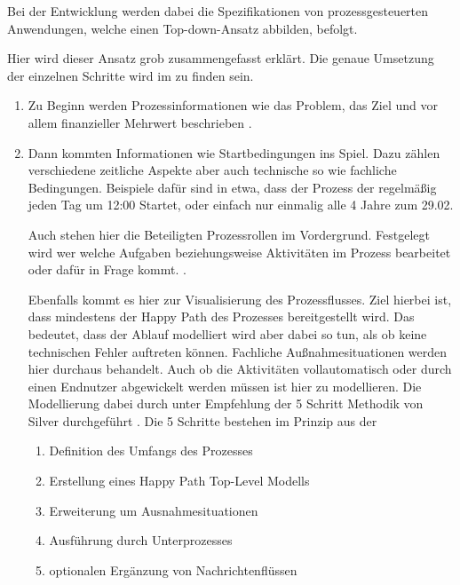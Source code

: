 \label{par:spezifikation_von_prozessgesteuerten_anwendungen}
Bei der Entwicklung werden dabei die Spezifikationen von prozessgesteuerten Anwendungen, welche einen Top-down-Ansatz abbilden, befolgt.

Hier wird dieser Ansatz grob zusammengefasst erklärt. Die genaue Umsetzung der einzelnen Schritte wird im  zu finden sein.
\begin{enumerate}
    \item Zu Beginn werden Prozessinformationen wie das Problem, das Ziel und vor allem finanzieller Mehrwert beschrieben \citep[vgl.][S. 60]{stiehl_prozessgesteuerte_2013}.
    
    \item \label{enu:item:spezifikation_von_prozessgesteuerten_anwendungen:prozessmodellierung} Dann kommten Informationen wie Startbedingungen ins Spiel. Dazu zählen verschiedene zeitliche Aspekte aber auch technische so wie fachliche Bedingungen. Beispiele dafür sind in etwa, dass der Prozess der regelmäßig jeden Tag um 12:00 Startet, oder einfach nur einmalig alle 4 Jahre zum 29.02. \cite[vgl.][S. 61f]{stiehl_prozessgesteuerte_2013}
    
    Auch stehen hier die Beteiligten Prozessrollen im Vordergrund. Festgelegt wird wer welche Aufgaben beziehungsweise Aktivitäten im Prozess bearbeitet oder dafür in Frage kommt. \citep[vgl.][S. 62]{stiehl_prozessgesteuerte_2013}.
    
    Ebenfalls kommt es hier zur Visualisierung des Prozessflusses. Ziel hierbei ist, dass mindestens der Happy Path des Prozesses bereitgestellt wird. Das bedeutet, dass der Ablauf modelliert wird aber dabei so tun, als ob keine technischen Fehler auftreten können. Fachliche Außnahmesituationen werden hier durchaus behandelt. Auch ob die Aktivitäten vollautomatisch oder durch einen Endnutzer abgewickelt werden müssen ist hier zu modellieren. Die Modellierung dabei durch unter Empfehlung der 5 Schritt Methodik von Silver durchgeführt \cite[vgl.][S. 67-75]{bruce_bpmn_2012}. Die 5 Schritte bestehen im Prinzip aus der
    \begin{enumerate}
        \item Definition des Umfangs des Prozesses
        \item Erstellung eines Happy Path Top-Level Modells
        \item Erweiterung um Ausnahmesituationen
        \item Ausführung durch Unterprozesses
        \item optionalen Ergänzung von Nachrichtenflüssen
    \end{enumerate}
    \cite[vgl.][S. 63ff]{stiehl_prozessgesteuerte_2013}
    

\end{enumerate}
